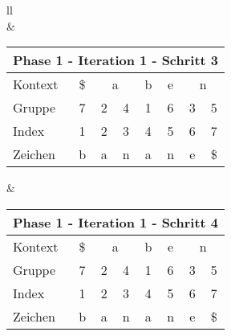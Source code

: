 \begin{table}[H]
\begin{adjustbox}{max width=\textwidth}
\begin{tabular}{ll}
\\
&
\\

\begin{tabular}{lccccccc}
\multicolumn{8}{l}{Phase 1 - Iteration 1 - Schritt 3}                                                                                                                                                                          \\ \hline
\multicolumn{1}{l|}{Kontext} & \multicolumn{1}{c|}{\$} & \multicolumn{2}{c|}{a}                                & \multicolumn{1}{c|}{b}    & \multicolumn{1}{c|}{e}    & \multicolumn{2}{c}{\cellcolor[HTML]{\green}n}         \\
\multicolumn{1}{l|}{Gruppe}  & \multicolumn{1}{c|}{7}  & 2                         & \multicolumn{1}{c|}{4}    & \multicolumn{1}{c|}{1}    & \multicolumn{1}{c|}{6}    & \cellcolor[HTML]{\green}3 & \cellcolor[HTML]{\green}5 \\ \hline
\multicolumn{1}{l|}{Index}   & 1                       & \cellcolor[HTML]{\red}2 & \cellcolor[HTML]{\green}3 & \cellcolor[HTML]{\red}4 & \cellcolor[HTML]{\green}5 & 6                         & 7                         \\
\multicolumn{1}{l|}{Zeichen} & b                       & \cellcolor[HTML]{\red}a & \cellcolor[HTML]{\green}n & \cellcolor[HTML]{\red}a & \cellcolor[HTML]{\green}n & e                         & \$                       
\end{tabular}

&

\begin{tabular}{lccccccc}
\multicolumn{8}{l}{Phase 1 - Iteration 1 - Schritt 4}                                                                                                                                                                                               \\ \hline
\multicolumn{1}{l|}{Kontext} & \multicolumn{1}{c|}{\$} & \multicolumn{2}{c|}{\cellcolor[HTML]{\red}a}                             & \multicolumn{1}{c|}{b}    & \multicolumn{1}{c|}{e}    & \multicolumn{2}{c}{\cellcolor[HTML]{\green}n}         \\
\multicolumn{1}{l|}{Gruppe}  & \multicolumn{1}{c|}{7}  & \cellcolor[HTML]{\red}2 & \multicolumn{1}{c|}{\cellcolor[HTML]{\red}4} & \multicolumn{1}{c|}{1}    & \multicolumn{1}{c|}{6}    & \cellcolor[HTML]{\green}3 & \cellcolor[HTML]{\green}5 \\ \hline
\multicolumn{1}{l|}{Index}   & 1                       & \cellcolor[HTML]{\red}2 & \cellcolor[HTML]{\green}3                      & \cellcolor[HTML]{\red}4 & \cellcolor[HTML]{\green}5 & 6                         & 7                         \\
\multicolumn{1}{l|}{Zeichen} & b                       & \cellcolor[HTML]{\red}a & \cellcolor[HTML]{\green}n                      & \cellcolor[HTML]{\red}a & \cellcolor[HTML]{\green}n & e                         & \$                       
\end{tabular}


\end{tabular}
\end{adjustbox}
\end{table}
